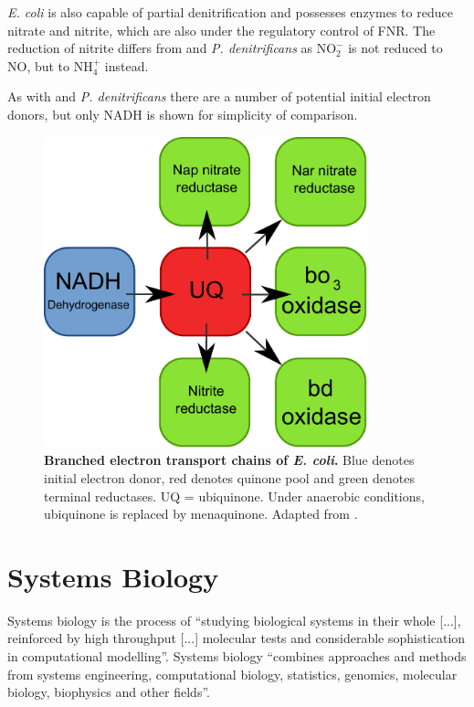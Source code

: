 \textit{E. coli} is also capable of partial denitrification and possesses enzymes to reduce nitrate and nitrite, which are also under the regulatory control of FNR. The reduction of nitrite differs from \Nm{} and \textit{P. denitrificans} as $\mathrm{NO}_2^-$ is not reduced to NO, but to $\mathrm{NH}_4^+$ instead.

As with \Nm{} and \textit{P. denitrificans} there are a number of potential initial electron donors, but only NADH is shown for simplicity of comparison.

\begin{figure}[tbp]
\begin{center}
	\includegraphics[height=9cm]{01-introduction/data/e_coli_resp.pdf}
	\caption[{Branched electron transport chains of \textit{E. coli}.}]{{\bf Branched electron transport chains of \textit{E. coli}.} Blue denotes initial electron donor, red denotes quinone pool and green denotes terminal reductases. UQ = ubiquinone. Under anaerobic conditions, ubiquinone is replaced by menaquinone. Adapted from \citet{Nicholls1992}.
	\label{fig:e_coli_resp}}
\end{center}
\end{figure}


\section{Systems Biology}
Systems biology is the process of ``studying biological systems in their whole [...], reinforced by high throughput [...] molecular tests and considerable sophistication in computational modelling''\cite{Kahlem2006}. Systems biology ``combines approaches and methods from systems engineering, computational biology, statistics, genomics, molecular biology, biophysics and other fields''\cite{Doyle2006}.

